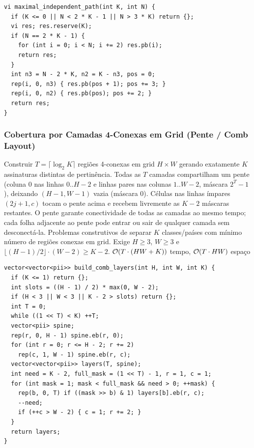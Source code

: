 \begin{lstlisting}
vi maximal_independent_path(int K, int N) {
  if (K <= 0 || N < 2 * K - 1 || N > 3 * K) return {};
  vi res; res.reserve(K);
  if (N == 2 * K - 1) {
    for (int i = 0; i < N; i += 2) res.pb(i);
    return res;
  }
  int n3 = N - 2 * K, n2 = K - n3, pos = 0;
  rep(i, 0, n3) { res.pb(pos + 1); pos += 3; }
  rep(i, 0, n2) { res.pb(pos); pos += 2; }
  return res;
}
\end{lstlisting}

\subsubsection{Cobertura por Camadas 4-Conexas em Grid (Pente / Comb Layout)}
\algobox
  {Construir $T = \lceil \log_2 K \rceil$ regiões 4-conexas em grid $H \times W$ gerando exatamente $K$ assinaturas distintas de pertinência.}
  {Todas as $T$ camadas compartilham um pente (coluna $0$ nas linhas $0..H-2$ e linhas pares nas colunas $1..W-2$, máscara $2^T - 1$), deixando $(H-1, W-1)$ vazia (máscara $0$). Células nas linhas ímpares $(2j+1, c)$ tocam o pente acima e recebem livremente as $K-2$ máscaras restantes.}
  {O pente garante conectividade de todas as camadas ao mesmo tempo; cada folha adjacente ao pente pode entrar ou sair de qualquer camada sem desconectá-la.}
  {Problemas construtivos de separar $K$ classes/países com mínimo número de regiões conexas em grid.}
  {Exige $H \ge 3$, $W \ge 3$ e $\lfloor (H-1)/2 \rfloor \cdot (W-2) \ge K - 2$.}
  {$\mathcal{O}(T \cdot (HW + K))$ tempo, $\mathcal{O}(T \cdot HW)$ espaço}

\begin{lstlisting}
vector<vector<pii>> build_comb_layers(int H, int W, int K) {
  if (K <= 1) return {};
  int slots = ((H - 1) / 2) * max(0, W - 2);
  if (H < 3 || W < 3 || K - 2 > slots) return {};
  int T = 0;
  while ((1 << T) < K) ++T;
  vector<pii> spine;
  rep(r, 0, H - 1) spine.eb(r, 0);
  for (int r = 0; r <= H - 2; r += 2)
    rep(c, 1, W - 1) spine.eb(r, c);
  vector<vector<pii>> layers(T, spine);
  int need = K - 2, full_mask = (1 << T) - 1, r = 1, c = 1;
  for (int mask = 1; mask < full_mask && need > 0; ++mask) {
    rep(b, 0, T) if ((mask >> b) & 1) layers[b].eb(r, c);
    --need;
    if (++c > W - 2) { c = 1; r += 2; }
  }
  return layers;
}
\end{lstlisting}

